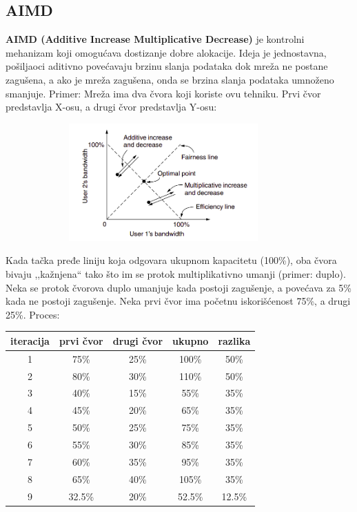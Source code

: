 \documentclass[a4paper]{article}
\begin{document}
    \subsection{AIMD }
        \textbf{AIMD (Additive Increase Multiplicative Decrease)} je kontrolni mehanizam koji omogućava dostizanje dobre alokacije. Ideja je jednostavna,
        pošiljaoci aditivno povećavaju brzinu slanja podataka dok mreža ne postane zagušena, a ako
        je mreža zagušena, onda se brzina slanja podataka umnoženo smanjuje. Primer: Mreža ima
        dva čvora koji koriste ovu tehniku. Prvi čvor predstavlja X-osu, a drugi čvor predstavlja
        Y-osu: 
        \begin{figure}[H]
            \begin{center}
                \includegraphics[width=100mm,height=45mm]{Slike/tcp_zagusenje3.png}
            \end{center}
        \end{figure}
        Kada tačka pređe liniju koja odgovara ukupnom kapacitetu (100\%), oba čvora
        bivaju ,,kažnjena`` tako što im se protok multiplikativno umanji (primer: duplo). Neka se
        protok čvorova duplo umanjuje kada postoji zagušenje, a povećava za 5\% kada ne postoji 
        zagušenje. Neka prvi čvor ima početnu iskorišćenost 75\%, a drugi 25\%.
        Proces:
        \begin{table}[H]
            \begin{center}
              \label{tab:table1}
              \begin{tabular}{c|c|c|c|c} 
                \textbf{iteracija} & \textbf{prvi čvor} & \textbf{drugi čvor} & \textbf{ukupno} & \textbf{razlika}\\
                \hline
                1 & 75\% & 25\% & 100\% & 50\%\\
                2 & 80\% & 30\% & 110\% & 50\%\\
                3 & 40\% & 15\% & 55\% & 35\%\\
                4 & 45\% & 20\% & 65\% & 35\%\\
                5 & 50\% & 25\% & 75\% & 35\%\\
                6 & 55\% & 30\% & 85\% & 35\%\\
                7 & 60\% & 35\% & 95\% & 35\%\\
                8 & 65\% & 40\% & 105\% & 35\%\\
                9 & 32.5\% & 20\% & 52.5\% & 12.5\%
              \end{tabular}
            \end{center}
        \end{table}
\end{document}
